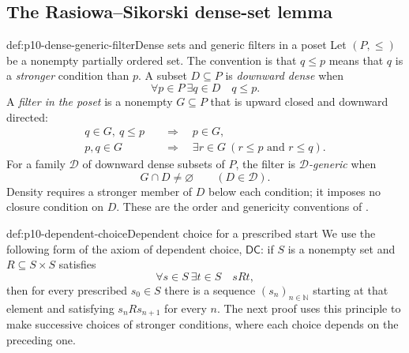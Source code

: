 
\subsection{The Rasiowa--Sikorski dense-set lemma}
\label{sec:p10-rasiowa-sikorski}

\begin{hbdefinition}{def:p10-dense-generic-filter}{Dense sets and generic filters in a poset}
Let \((P,\leq)\) be a nonempty partially ordered set.
The convention is that \(q\leq p\) means that \(q\) is a
\emph{stronger} condition than \(p\).
A subset \(D\subseteq P\) is \emph{downward dense} when
\[
 \forall p\in P\ \exists q\in D\quad q\leq p.
\]
A \emph{filter in the poset} is a nonempty \(G\subseteq P\) that
is upward closed and downward directed:
\[
\begin{aligned}
 q\in G,\ q\leq p&\quad\Longrightarrow\quad p\in G,\\
 p,q\in G&\quad\Longrightarrow\quad
       \exists r\in G\ (r\leq p\text{ and }r\leq q).
\end{aligned}
\]
For a family \(\mathcal D\) of downward dense subsets of \(P\),
the filter is \emph{\(\mathcal D\)-generic} when
\[
 G\cap D\ne\varnothing\qquad(D\in\mathcal D).
\]
Density requires a stronger member of \(D\) below each condition;
it imposes no closure condition on \(D\).
These are the order and genericity conventions of
\cite[\S8.1, pp.~130--132]{Ciesielski1997}.
\end{hbdefinition}

\begin{hbdefinition}{def:p10-dependent-choice}{Dependent choice for a prescribed start}
We use the following form of the axiom of dependent choice,
\(\mathsf{DC}\): if \(S\) is a nonempty set and
\(R\subseteq S\times S\) satisfies
\[
 \forall s\in S\ \exists t\in S\quad sRt,
\]
then for every prescribed \(s_0\in S\) there is a sequence
\((s_n)_{n\in\mathbb N}\) starting at that element and satisfying
\(s_nRs_{n+1}\) for every \(n\).
The next proof uses this principle to make successive choices of
stronger conditions, where each choice depends on the preceding one.
\end{hbdefinition}

